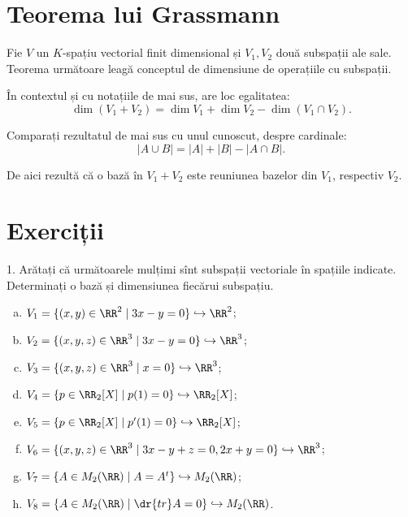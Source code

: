 \section{Teorema lui Grassmann}

Fie $ V $ un $ K $-spațiu vectorial finit dimensional și $ V_1, V_2 $ două subspații
ale sale. Teorema următoare leagă conceptul de dimensiune de operațiile cu subspații.

\begin{theorem}\label{thm:grass}
    În contextul și cu notațiile de mai sus, are loc egalitatea:
    \[
        \dim(V_1 + V_2) = \dim V_1 + \dim V_2 - \dim(V_1 \cap V_2).
    \]
\end{theorem}

Comparați rezultatul de mai sus cu unul cunoscut, despre cardinale:
\[
    |A \cup B| = |A| + |B| - |A \cap B|.
\]

De aici rezultă că o bază în $ V_1 + V_2 $ este reuniunea bazelor din $ V_1 $,
respectiv $ V_2 $.

\section{Exerciții}

1. Arătați că următoarele mulțimi sînt subspații vectoriale în spațiile indicate.
Determinați o bază și dimensiunea fiecărui subspațiu.
\begin{enumerate}[(a)]
    \item $ V_1 = \{ (x, y) \in \RR^2 \mid 3x - y = 0 \} \hookrightarrow \RR^2 $;
    \item $ V_2 = \{ (x, y, z) \in \RR^3 \mid 3x - y = 0 \} \hookrightarrow \RR^3 $;
    \item $ V_3 = \{ (x, y, z) \in \RR^3 \mid x = 0 \} \hookrightarrow \RR^3 $;
    \item $ V_4 = \{ p \in \RR_2[X] \mid p(1) = 0 \} \hookrightarrow \RR_2[X] $;
    \item $ V_5 = \{ p \in \RR_2[X] \mid p'(1) = 0 \} \hookrightarrow \RR_2[X] $;
    \item $ V_6 = \{ (x, y, z) \in \RR^3 \mid 3x - y + z = 0, 2x + y = 0 \} \hookrightarrow \RR^3 $;
    \item $ V_7 = \{ A \in M_2(\RR) \mid A = A^t \} \hookrightarrow M_2(\RR) $;
    \item $ V_8 = \{ A \in M_2(\RR) \mid \dr{tr}A = 0 \} \hookrightarrow M_2(\RR) $.
\end{enumerate}

